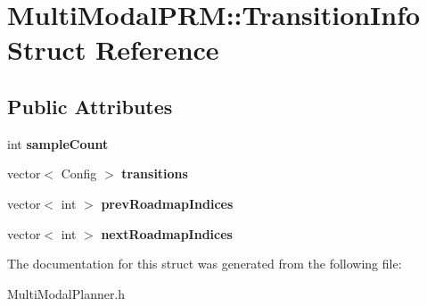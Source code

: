 \section{Multi\+Modal\+P\+RM\+:\+:Transition\+Info Struct Reference}
\label{structMultiModalPRM_1_1TransitionInfo}
\subsection*{Public Attributes}
\begin{DoxyCompactItemize}
\item 
int {\bfseries sample\+Count}\label{structMultiModalPRM_1_1TransitionInfo_a064d83eb1b966f212bd3f128cb391bd9}

\item 
vector$<$ Config $>$ {\bfseries transitions}\label{structMultiModalPRM_1_1TransitionInfo_ab2619d3c1da4076996151bea3a5b9070}

\item 
vector$<$ int $>$ {\bfseries prev\+Roadmap\+Indices}\label{structMultiModalPRM_1_1TransitionInfo_a98fe9675c4d7d21ccfdde938e24bbe7d}

\item 
vector$<$ int $>$ {\bfseries next\+Roadmap\+Indices}\label{structMultiModalPRM_1_1TransitionInfo_a6f86bbe21272da88c4f583054173a0d9}

\end{DoxyCompactItemize}


The documentation for this struct was generated from the following file\+:\begin{DoxyCompactItemize}
\item 
Multi\+Modal\+Planner.\+h\end{DoxyCompactItemize}
